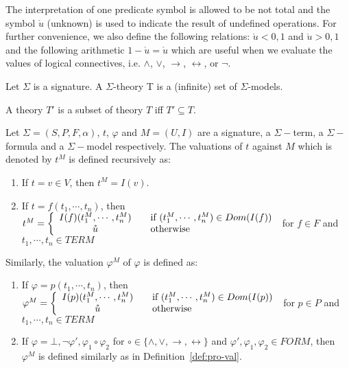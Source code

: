 The interpretation of one predicate symbol is allowed to be not total and the symbol $\mathring{u}$ (unknown) is used to indicate the result of undefined operations. For further convenience, we also define the following relations: $\mathring{u} < 0, 1$ and $\mathring{u} > 0, 1$ and the following arithmetic $1 - \mathring{u} = \mathring{u}$ which are useful when we evaluate the values of logical connectives, i.e. $\wedge$, $\vee$, $\rightarrow$, $\leftrightarrow$, or $\neg$. 

\begin{definition}
Let $\Sigma$ is a signature. A $\Sigma$-theory T is a (infinite) set of $\Sigma$-models.
\end{definition}
A theory $T'$ is a subset of theory $T$ iff $T' \subseteq T$.

\begin{definition}
Let $\Sigma = (S, P, F, \alpha)$, $t$, $\varphi$ and $M=(U, I)$ are a signature, a $\Sigma-$term, a $\Sigma-$formula and a $\Sigma-$model respectively. The valuations of $t$ against $M$ which is denoted by $t^M$ is defined recursively as:
\begin{enumerate}
\item If $t = v \in V$, then $t^M = I(v)$.
\item If $t = f(t_1, \cdots, t_n)$, then $t^M = \left\{ 
  \begin{array}{c l}
    I(f)(t_1^M, \cdots, t_n^M) & \quad \text{if } (t_1^M, \cdots, t_n^M) \in Dom(I(f))\\
    \mathring{u} & \quad \text{otherwise }\\
  \end{array} \right.$ for $f \in F$ and $t_1,\cdots, t_n \in TERM$
\end{enumerate}
Similarly, the valuation $\varphi^M$ of $\varphi$ is defined as:
\begin{enumerate}
\item If $\varphi = p(t_1,\cdots,t_n)$, then $\varphi^M = \left\{ 
  \begin{array}{c l}
    I(p)(t_1^M,\cdots,t_n^M) & \quad \text{if } (t_1^M, \cdots, t_n^M) \in Dom(I(p))\\
    \mathring{u} & \quad \text{otherwise }\\
  \end{array} \right.$ for $p \in P$ and $t_1,\cdots, t_n \in TERM$
\item If $\varphi = \bot, \neg\varphi', \varphi_1 \circ \varphi_2$ for $\circ \in \{\wedge, \vee, \rightarrow, \leftrightarrow\}$ and $\varphi', \varphi_1, \varphi_2 \in FORM$, then $\varphi^M$ is defined similarly as in Definition~\ref{def:pro-val}.

\end{enumerate}
\end{definition}
